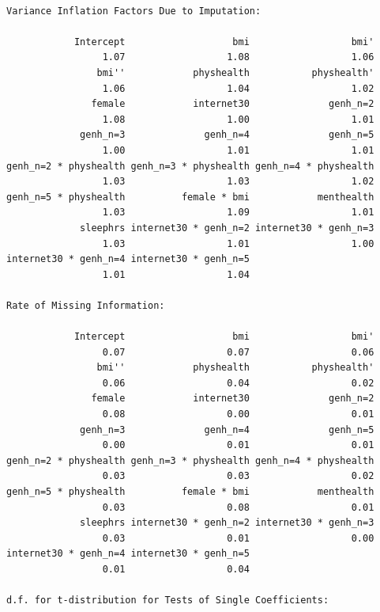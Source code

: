 \documentclass[]{book}
\theoremstyle{definition}
\theoremstyle{definition}
\theoremstyle{definition}
\theoremstyle{remark}
\begin{document}
\begin{verbatim}

Variance Inflation Factors Due to Imputation:

            Intercept                   bmi                  bmi' 
                 1.07                  1.08                  1.06 
                bmi''            physhealth           physhealth' 
                 1.06                  1.04                  1.02 
               female            internet30              genh_n=2 
                 1.08                  1.00                  1.01 
             genh_n=3              genh_n=4              genh_n=5 
                 1.00                  1.01                  1.01 
genh_n=2 * physhealth genh_n=3 * physhealth genh_n=4 * physhealth 
                 1.03                  1.03                  1.02 
genh_n=5 * physhealth          female * bmi            menthealth 
                 1.03                  1.09                  1.01 
             sleephrs internet30 * genh_n=2 internet30 * genh_n=3 
                 1.03                  1.01                  1.00 
internet30 * genh_n=4 internet30 * genh_n=5 
                 1.01                  1.04 

Rate of Missing Information:

            Intercept                   bmi                  bmi' 
                 0.07                  0.07                  0.06 
                bmi''            physhealth           physhealth' 
                 0.06                  0.04                  0.02 
               female            internet30              genh_n=2 
                 0.08                  0.00                  0.01 
             genh_n=3              genh_n=4              genh_n=5 
                 0.00                  0.01                  0.01 
genh_n=2 * physhealth genh_n=3 * physhealth genh_n=4 * physhealth 
                 0.03                  0.03                  0.02 
genh_n=5 * physhealth          female * bmi            menthealth 
                 0.03                  0.08                  0.01 
             sleephrs internet30 * genh_n=2 internet30 * genh_n=3 
                 0.03                  0.01                  0.00 
internet30 * genh_n=4 internet30 * genh_n=5 
                 0.01                  0.04 

d.f. for t-distribution for Tests of Single Coefficients:


\end{verbatim}
\end{document}
